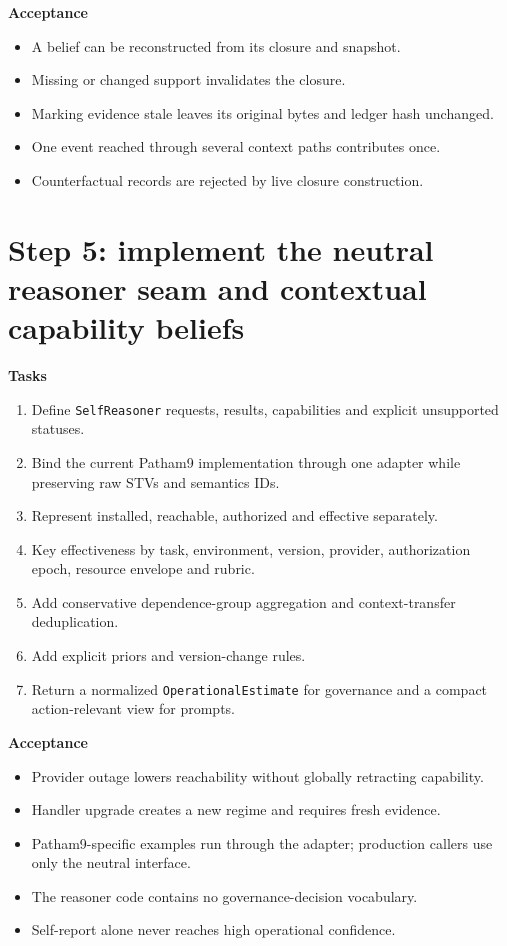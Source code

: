 \documentclass[11pt,oneside]{report}
\begin{document}
\textbf{Acceptance}
\begin{itemize}
  \item A belief can be reconstructed from its closure and snapshot.
  \item Missing or changed support invalidates the closure.
  \item Marking evidence stale leaves its original bytes and ledger hash unchanged.
  \item One event reached through several context paths contributes once.
  \item Counterfactual records are rejected by live closure construction.
\end{itemize}

\section{Step 5: implement the neutral reasoner seam and contextual capability beliefs}

\textbf{Tasks}
\begin{enumerate}
  \item Define \texttt{SelfReasoner} requests, results, capabilities and explicit unsupported statuses.
  \item Bind the current Patham9 implementation through one adapter while preserving raw STVs and semantics IDs.
  \item Represent installed, reachable, authorized and effective separately.
  \item Key effectiveness by task, environment, version, provider, authorization epoch, resource envelope and rubric.
  \item Add conservative dependence-group aggregation and context-transfer deduplication.
  \item Add explicit priors and version-change rules.
  \item Return a normalized \texttt{OperationalEstimate} for governance and a compact action-relevant view for prompts.
\end{enumerate}

\textbf{Acceptance}
\begin{itemize}
  \item Provider outage lowers reachability without globally retracting capability.
  \item Handler upgrade creates a new regime and requires fresh evidence.
  \item Patham9-specific examples run through the adapter; production callers use only the neutral interface.
  \item The reasoner code contains no governance-decision vocabulary.
  \item Self-report alone never reaches high operational confidence.
\end{itemize}
\end{document}
